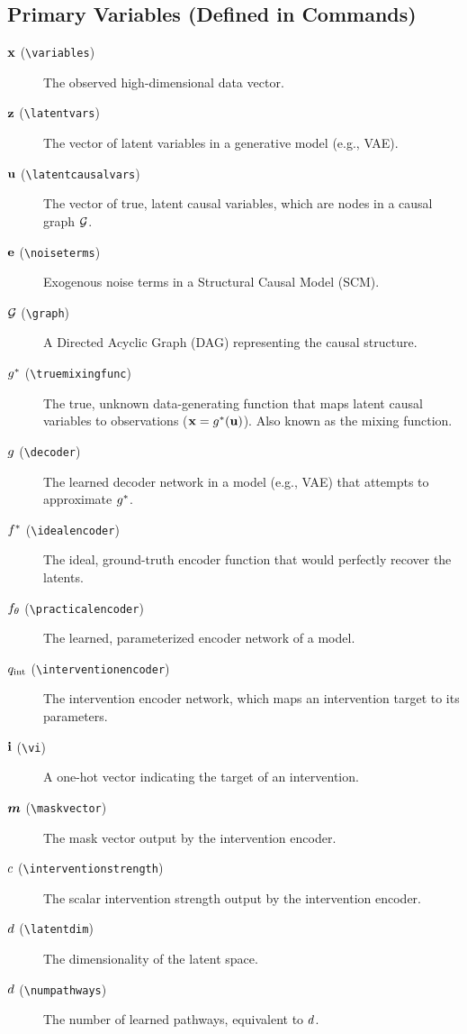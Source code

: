 \documentclass{article}
\begin{document}
\subsection{Primary Variables (Defined in Commands)}
\begin{description}
    \item[${\mathbf{x}}$ (\texttt{\textbackslash variables})] The observed high-dimensional data vector.
    \item[${\mathbf{z}}$ (\texttt{\textbackslash latentvars})] The vector of latent variables in a generative model (e.g., VAE).
    \item[${\mathbf{u}}$ (\texttt{\textbackslash latentcausalvars})] The vector of true, latent causal variables, which are nodes in a causal graph ${\mathcal{G}}$.
    \item[${\mathbf{e}}$ (\texttt{\textbackslash noiseterms})] Exogenous noise terms in a Structural Causal Model (SCM).
    \item[${\mathcal{G}}$ (\texttt{\textbackslash graph})] A Directed Acyclic Graph (DAG) representing the causal structure.
    \item[$g^*$ (\texttt{\textbackslash truemixingfunc})] The true, unknown data-generating function that maps latent causal variables to observations (${\mathbf{x}} = g^*({\mathbf{u}})$). Also known as the mixing function.
    \item[$g$ (\texttt{\textbackslash decoder})] The learned decoder network in a model (e.g., VAE) that attempts to approximate $g^*$.
    \item[$f^*$ (\texttt{\textbackslash idealencoder})] The ideal, ground-truth encoder function that would perfectly recover the latents.
    \item[$f_\theta$ (\texttt{\textbackslash practicalencoder})] The learned, parameterized encoder network of a model.
    \item[$q_{\text{int}}$ (\texttt{\textbackslash interventionencoder})] The intervention encoder network, which maps an intervention target to its parameters.
    \item[$\vect{i}$ (\texttt{\textbackslash vi})] A one-hot vector indicating the target of an intervention.
    \item[${\bm{m}}$ (\texttt{\textbackslash maskvector})] The mask vector output by the intervention encoder.
    \item[$c$ (\texttt{\textbackslash interventionstrength})] The scalar intervention strength output by the intervention encoder.
    \item[$d$ (\texttt{\textbackslash latentdim})] The dimensionality of the latent space.
    \item[$d$ (\texttt{\textbackslash numpathways})] The number of learned pathways, equivalent to $d$.
\end{description}
\end{document}
